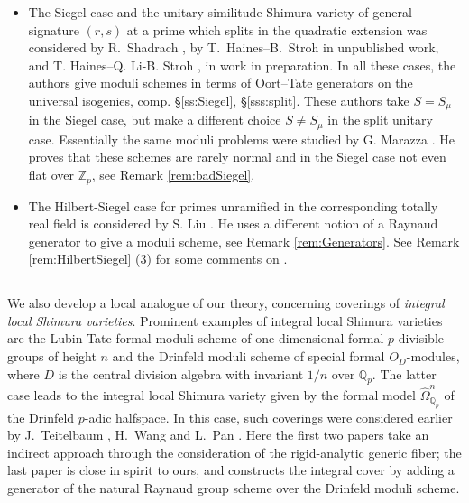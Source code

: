 \documentclass[reqno, 10pt]{amsart}
\newcommand{\BQ}{\ensuremath{\mathbb {Q}}\xspace}
\newcommand{\BZ}{\ensuremath{\mathbb {Z}}\xspace}
\newcommand{\CS}{\ensuremath{\mathcal {S}}\xspace}
\newcommand{\wh}{\widehat}
\theoremstyle{definition}
\numberwithin{equation}{subsection}
\numberwithin{subsubsection}{subsection}
\begin{document}
\begin{itemize}
They give a moduli problem for $\CS_{K_1}$ in terms of generators of Oort--Tate group schemes and show that $\CS_{K_1}$ is a regular scheme finite and flat over $\CS_K$. 
\item The Siegel case and the unitary similitude Shimura variety of general signature $(r, s)$ at a prime which splits in the quadratic extension
was considered by R.~Shadrach \cite{Shadrach}, by T.~Haines--B.~Stroh \cite{HS} in unpublished work, and T. Haines--Q. Li-B. Stroh \cite{HLS}, in work in preparation. In all these cases, the authors give 
moduli schemes in terms of Oort--Tate generators on the universal isogenies, comp. \S \ref{ss:Siegel}, \S \ref{sss:split}. 
These authors take $S=S_\mu$ in the Siegel case, but make a different choice $S\neq S_\mu$ in the split unitary case. Essentially the same moduli problems were studied by G. Marazza \cite{Marazza}.  He proves that these schemes are rarely normal and in the Siegel case not even flat over $\BZ_p$, see Remark \ref{rem:badSiegel}.

\item The Hilbert-Siegel case for primes unramified in the corresponding totally real field is considered by S. Liu  \cite{SLiu}. He uses
a different notion of a Raynaud generator to give a moduli scheme, see Remark \ref{rem:Generators}. See Remark \ref{rem:HilbertSiegel} (3)
for some comments on \cite{SLiu}.

 
 \end{itemize}
 \subsection{} We also develop  a local analogue of our theory, concerning coverings of \emph{integral local Shimura varieties}.  Prominent examples of integral local Shimura varieties are the Lubin-Tate formal moduli scheme of one-dimensional formal $p$-divisible groups of height $n$ and the Drinfeld moduli scheme of special formal $O_D$-modules, where $D$ is the central division algebra with invariant $1/n$ over $\BQ_p$. The latter case leads to the integral local Shimura variety given by the formal model $\wh{\Omega}^n_{\BQ_p}$ of the Drinfeld $p$-adic halfspace. In this case, such coverings were considered earlier by J.~Teitelbaum \cite{T}, H.~Wang \cite{W} and L.~Pan \cite{P}. Here the first two papers take an indirect approach through the consideration of the rigid-analytic generic fiber; the last paper is close in spirit to ours, and constructs the integral cover by adding a generator of the natural Raynaud group scheme over the Drinfeld moduli scheme.  
  
\end{document}
